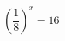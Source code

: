 \begin{ex}[type=equation]
	\begin{condition}
		\( \left( \dfrac{1}{8} \right)^x=16 \)
	\end{condition}
\end{ex}